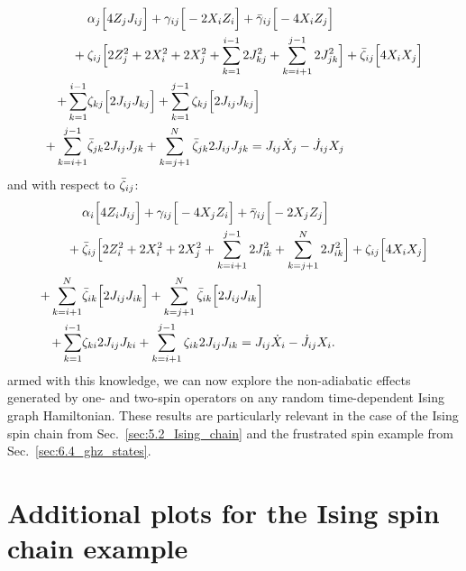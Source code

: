 \begin{equation}\label{eq:ising_graph_minimise_zeta}
    \begin{aligned}
        &\alpha_j\Big[ 4 Z_j J_{ij} \Big] + \gamma_{ij}\Big[ - 2 X_i Z_i\Big] + \Bar{\gamma}_{ij} \Big[ - 4 X_i Z_j \Big] \\
        + \: &\zeta_{ij} \Big[ 2 Z_j^2 + 2X_i^2 + 2X_j^2 + \sum_{k = 1}^{i-1} 2 J_{kj}^2 + \sum_{k = i+1}^{j-1} 2 J_{jk}^2 \Big] + \Bar{\zeta}_{ij}\Big[ 4 X_i X_j \Big] \\
        + \sum_{k = 1}^{i-1} &\zeta_{kj}\Big[ 2 J_{ij} J_{kj} \Big] + \sum_{k = 1}^{j-1} \zeta_{kj} \Big[2 J_{ij}J_{kj}\Big] \\
        + \sum_{k = i +1}^{j-1} &\Bar{\zeta}_{jk} 2 J_{ij} J_{jk} + \sum_{k = j +1}^N \Bar{\zeta}_{jk} 2 J_{ij} J_{jk} = J_{ij} \dot{X}_j - \dot{J}_{ij} X_j
    \end{aligned}
\end{equation}
and with respect to $\Bar{\zeta}_{ij}$:
\begin{equation}\label{eq:ising_graph_minimise_zetabar}
    \begin{aligned}
        &\alpha_i\Big[ 4 Z_i J_{ij} \Big] + \gamma_{ij}\Big[ - 4 X_j Z_i\Big] + \Bar{\gamma}_{ij} \Big[ - 2 X_j Z_j \Big] \\
        + \: &\Bar{\zeta}_{ij} \Big[ 2 Z_i^2 + 2X_i^2 + 2X_j^2 + \sum_{k = i+1}^{j-1} 2 J_{ik}^2 + \sum_{k = j+1}^N 2 J_{ik}^2 \Big] + \zeta_{ij}\Big[ 4 X_i X_j \Big] \\
        + \sum_{k = i+1}^N &\Bar{\zeta}_{ik}\Big[ 2 J_{ij} J_{ik} \Big] + \sum_{k = j+1}^N \Bar{\zeta}_{ik} \Big[2 J_{ij}J_{ik}\Big] \\
        + \sum_{k = 1}^{i-1} &\zeta_{ki} 2 J_{ij} J_{ki} + \sum_{k = i+1}^{j-1} \zeta_{ik} 2 J_{ij} J_{ik} = J_{ij} \dot{X}_i - \dot{J}_{ij} X_i.
    \end{aligned}
\end{equation}
armed with this knowledge, we can now explore the non-adiabatic effects generated by one- and two-spin operators on any random time-dependent Ising graph Hamiltonian. These results are particularly relevant in the case of the Ising spin chain from Sec.~\ref{sec:5.2_Ising_chain} and the frustrated spin example from Sec.~\ref{sec:6.4_ghz_states}.

\chapter{Additional plots for the Ising spin chain example}\label{app:ising}

